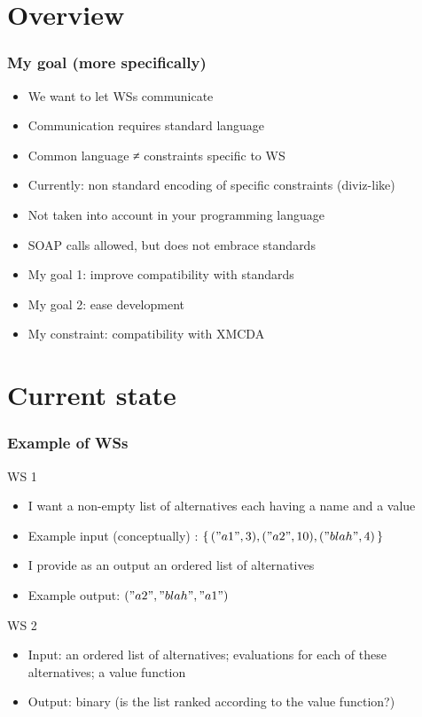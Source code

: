 \documentclass[french,english]{beamer}
\begin{document}
\section{Overview}
\begin{frame}
	\frametitle{My goal (more specifically)}
	\begin{itemize}
		\item We want to let \acp{WS} communicate
		\item Communication requires standard language
		\item Common language ≠ constraints specific to WS
		\item Currently: non standard encoding of specific constraints (diviz-like)
		\item Not taken into account in your programming language
		\item SOAP calls allowed, but does not embrace standards
		\item My goal 1: improve compatibility with standards
		\item My goal 2: ease development
		\item My constraint: compatibility with XMCDA
	\end{itemize}
\end{frame}

\section{Current state}
\begin{frame}
	\frametitle{Example of \acp{WS}}
	\ac{WS} 1
	\begin{itemize}
		\item I want a non-empty list of alternatives each having a name and a value
		\item Example input (conceptually) : $\set{("a1", 3), ("a2", 10), ("blah", 4)}$
		\item I provide as an output an ordered list of alternatives
		\item Example output: $("a2", "blah", "a1")$
	\end{itemize}
	\ac{WS} 2
	\begin{itemize}
		\item Input: an ordered list of alternatives; evaluations for each of these alternatives; a value function
		\item Output: binary (is the list ranked according to the value function?)
	\end{itemize}
\end{frame}
\end{document}
